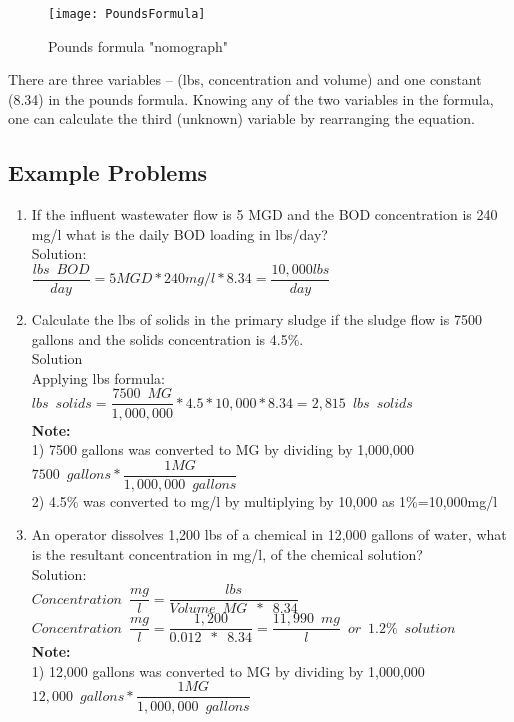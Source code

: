 \begin{figure}[h!]
\begin{center}
\texttt{[image: PoundsFormula]}
\end{center}
\caption{Pounds formula "nomograph"}
\end{figure}
\vspace{0.3cm}
There are three variables – (lbs, concentration and volume) and one constant (8.34) in the pounds formula.  Knowing any of the two variables in the formula, one can calculate the third (unknown) variable by rearranging the equation.
\subsection{Example Problems}
\begin{enumerate}

\item If the influent wastewater flow is 5 MGD and the BOD concentration is 240 mg/l what is the daily BOD loading in lbs/day?\\
Solution:\\
$\dfrac{lbs \enspace BOD}{day}=5MGD*240mg/l*8.34=\boxed{\dfrac{10,000lbs}{day}}$\\

\item Calculate the lbs of solids in the primary sludge if the sludge flow is 7500 gallons and the solids concentration is 4.5\%.\\
Solution\\
Applying lbs formula:\\
$lbs \enspace solids = \dfrac{7500 \enspace MG}{1,000,000} * 4.5*10,000 *8.34 = \boxed{2,815 \enspace lbs \enspace solids}$\\
\textbf{Note:}\\  
1) 7500 gallons was converted to MG by dividing by 1,000,000\\
$7500 \enspace gallons * \dfrac{1 MG}{1,000,000 \enspace gallons}$\\
2) 4.5\% was converted to mg/l by multiplying by 10,000 as 1\%=10,000mg/l

\item An operator dissolves 1,200 lbs of a chemical in 12,000 gallons of water, what is the resultant concentration in mg/l, of the chemical solution?\\
Solution:\\
$Concentration \enspace \dfrac{mg}{l}=\dfrac{lbs}{Volume \enspace MG \enspace * \enspace 8.34}$\\
$Concentration \enspace \dfrac{mg}{l}=\dfrac{1,200}{0.012 \enspace * \enspace 8.34}=\boxed{\dfrac{11,990 \enspace mg}{l} \enspace or \enspace 1.2\% \enspace solution}$\\
\textbf{Note:}\\  
1) 12,000 gallons was converted to MG by dividing by 1,000,000\\
$12,000 \enspace gallons * \dfrac{1 MG}{1,000,000 \enspace gallons}$\\
\end{enumerate}
